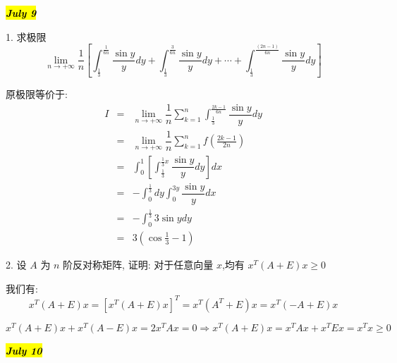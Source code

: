 \hl{\textbf{\textit{July 9}}}

1. 求极限
$$\lim\limits_{n\rightarrow +\infty}\dfrac{1}{n}\left[\int_{\frac{1}{3}}^{\frac{1}{6n}}\dfrac{\sin y}{y}dy+\int_{\frac{1}{3}}^{\frac{3}{6n}}\dfrac{\sin y}{y}dy+\cdots+\int_{\frac{1}{3}}^{\frac{(2n-1)}{6n}}\dfrac{\sin y}{y}dy \right]$$
\begin{solution}
	
	原极限等价于: 
	\begin{eqnarray*}
		I&=&\lim\limits_{n\rightarrow +\infty}\dfrac{1}{n}\sum\limits_{k=1}^{n}\int_{\frac{1}{3}}^{\frac{2k-1}{6n}}\dfrac{\sin y}{y}dy\\
		&=&\lim\limits_{n\rightarrow +\infty}\dfrac{1}{n}\sum\limits_{k=1}^{n}f(\frac{2k-1}{2n})\\
		&=&\int_{0}^{1}[\int_{\frac{1}{3}}^{\frac{1}{3}x}\dfrac{\sin y}{y}dy]dx\\
		&=&-\int_{0}^{\frac{1}{3}}dy\int_{0}^{3y}\dfrac{\sin y}{y}dx\\
		&=&-\int_{0}^{\frac{1}{3}}3\sin ydy\\
		&=&3(\cos \frac{1}{3}-1)
	\end{eqnarray*}
\end{solution}

2. 设 $A$ 为 $n$ 阶反对称矩阵, 证明: 对于任意向量 $x$,均有 $x^{T}(A+E)x\geq 0$
\begin{solution}
	
	我们有: $$x^{T}(A+E)x=[x^{T}(A+E)x]^T=x^{T}(A^{T}+E)x=x^{T}(-A+E)x$$
	
	$$x^{T}(A+E)x+x^{T}(A-E)x=2x^{T}Ax=0\Rightarrow x^{T}(A+E)x=x^{T}Ax+x^{T}Ex=x^{T}x\geq 0$$
\end{solution}

\hl{\textbf{\textit{July 10}}}

